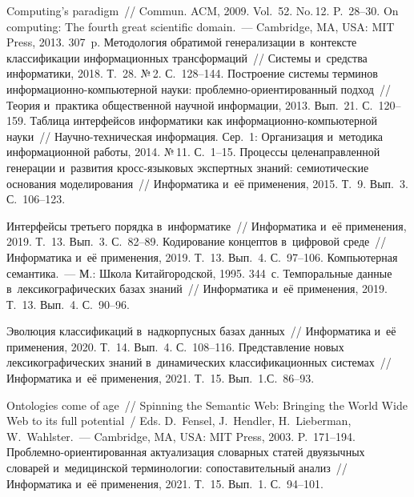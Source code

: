 \begin{multicols}{2}
{{\begin{thebibliography}{99}
 Computing's paradigm~// Commun. ACM, 2009. Vol.~52. No.\,12. P.~28--30.
 On computing: The fourth great scientific domain.~--- Cambridge, MA, USA: 
MIT Press, 2013. 307~p.
 Методология обратимой генерализации в~контексте классификации 
информационных трансформаций~// Системы и~средства информатики, 2018. Т.~28. №\,2. 
С.~128--144.
 Построение системы терминов ин\-фор\-ма\-ци\-он\-но-компьютерной науки:  
проб\-лем\-но-ори\-ен\-ти\-ро\-ван\-ный подход~// Тео\-рия и~практика общественной научной 
информации, %
2013. Вып.~21. С.~120--159.
 Таблица интерфейсов информатики как  
ин\-фор\-ма\-ци\-он\-но-ком\-пью\-тер\-ной науки~// На\-уч\-но-тех\-ни\-че\-ская информация. 
Сер.~1: Организация и~методика информационной работы, 2014. №\,11. С.~1--15.
 Процессы целенаправленной генерации и~развития кросс-язы\-ко\-вых 
экспертных знаний: семиотические основания моделирования~// Информатика и~её 
применения, 2015. Т.~9. Вып.~3. С.~106--123.

\pagebreak

 Интерфейсы третьего порядка в~информатике~// Информатика и~её 
применения, 2019. Т.~13. Вып.~3. С.~82--89.
 Кодирование концептов в~цифровой среде~// Информатика и~её 
применения, 2019. Т.~13. Вып.~4. С.~97--106.
 Компьютерная семантика.~--- М.: Школа 
Китайгородской, 1995. 344~с.
 Темпоральные данные 
в~лексикографических базах знаний~// Информатика и~её применения, 2019. Т.~13. Вып.~4.  
С.~90--96.


 Эволюция классификаций в~надкорпусных 
базах данных~// Информатика и~её применения, 2020. Т.~14. Вып.~4. С.~108--116.
 Пред\-став\-ле\-ние новых 
лексикографических знаний в~ди\-на\-ми\-че\-ских классификационных системах~// Информатика 
и~её применения, 2021. Т.~15. Вып.~1.\linebreak С.~86--93.
{ %

}
 Ontologies come of age~// Spinning the Semantic Web: Bringing the World 
Wide Web to its full potential~/ Eds. D.~Fensel, J.~Hendler, H.~Lieberman, W.~Wahlster.~--- 
Cambridge, MA, USA: MIT Press, 2003. P.~171--194.
 Проб\-лем\-но-ори\-ен\-ти\-ро\-ван\-ная актуализация словарных статей 
двуязычных словарей и~медицинской терминологии: сопоставительный анализ~// Информатика 
и~её применения, 2021. Т.~15. Вып.~1. С.~94--101.

\end{thebibliography}

 }
 }

\end{multicols}

